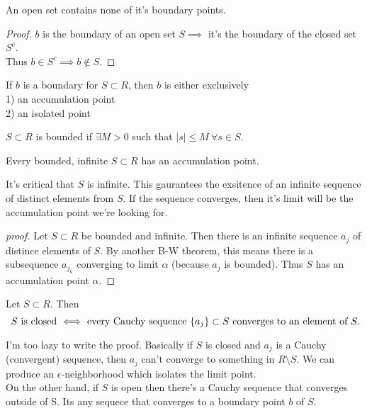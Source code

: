\documentclass{article}
\begin{document}
\begin{corollary}
    An open set contains none of it's boundary points.
\end{corollary}
\begin{proof}
   \( b \) is the boundary of an open set \( S \implies \) it's the
   boundary of the closed set \( S^c \).\\ Thus \( b \in S^c \implies b \notin S \).  
\end{proof}

\begin{theorem}
    If \( b \) is a boundary for \( S \subset R \),
    then \( b \) is either exclusively \\
1) an accumulation point\\
2) an isolated point
\end{theorem}

\pagebreak

\begin{definition}
    \( S \subset R \) is bounded if \( \exists M > 0\) such that \( |s| \le M \  \forall s \in S \).
\end{definition}

\begin{theorem} 
    Every bounded, infinite \( S \subset R \) has an accumulation point.
\end{theorem}

It's critical that \( S \) is infinite. This gaurantees the exsitence of an infinite sequence
of distinct elements from \( S \). If the sequence
converges, then it's limit will be the accumulation point we're looking for.

\begin{proof}[proof]
    Let \( S \subset R \) be bounded and infinite. Then there is an infinite sequence 
    \( a_j \) of distince elements of \( S \). By another B-W theorem, this means
    there is a subsequence \( a_{j_k} \) converging to limit  \( \alpha \) 
    (because \( a_j \) is bounded). Thus \( S \) has an accumulation point \( \alpha \).
\end{proof}


\begin{proposition}
    Let \( S \subset R \). Then
    \[
        \text{ \( S \) is closed \( \iff \) every 
        Cauchy sequence \( \{ a_j\} \subset S \) converges to an element of \( S \).}
    \]
\end{proposition}

I'm too lazy to write the proof. Basically if \(  S \) is closed and \( a_j \) is a
Cauchy (convergent) sequence, then \( a_j \) can't converge to something in \( R \setminus S \).
We can produce an \( \epsilon \)-neighborhood which isolates the limit point.\\
On the other hand, if \( S \) is open then there's a Cauchy sequence that converges outside
of S. Its any sequece that converges to a boundary point \( b \) of \( S \).
\end{document}

